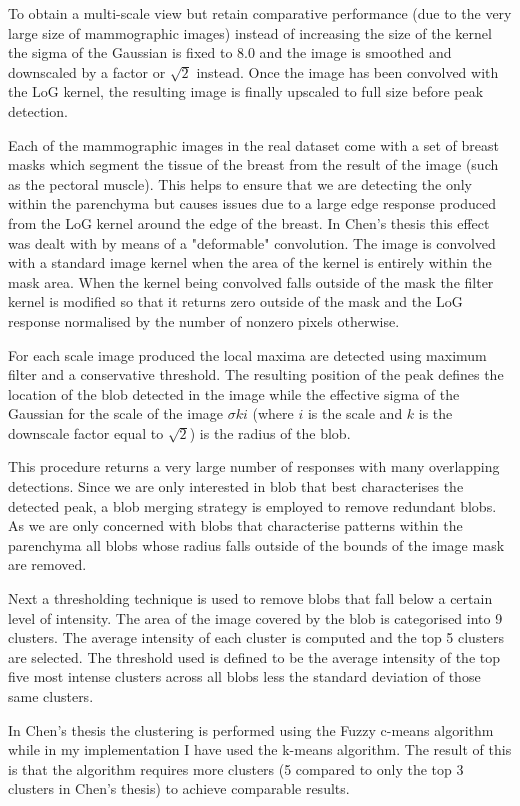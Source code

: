 To obtain a multi-scale view but retain comparative performance (due to the very large size of mammographic images) instead of increasing the size of the kernel the sigma of the Gaussian is fixed to 8.0 and the image is smoothed and downscaled by a factor or $\sqrt{2}$ instead. Once the image has been convolved with the LoG kernel, the resulting image is finally upscaled to full size before peak detection.

Each of the mammographic images in the real dataset come with a set of breast masks which segment the tissue of the breast from the result of the image (such as the pectoral muscle). This helps to ensure that we are detecting the only within the parenchyma but causes issues due to a large edge response produced from the LoG kernel around the edge of the breast. In Chen's thesis this effect was dealt with by means of a "deformable" convolution. The image is convolved with a standard image kernel when the area of the kernel is entirely within the mask area. When the kernel being convolved falls outside of the mask the filter kernel is modified so that it returns zero outside of the mask and the LoG response normalised by the number of nonzero pixels otherwise.

For each scale image produced the local maxima are detected using maximum filter and a conservative threshold. The resulting position of the peak defines the location of the blob detected in the image while the effective sigma of the Gaussian for the scale of the image $\sigma k i$ (where $i$ is the scale and $k$ is the downscale factor equal to $\sqrt{2}$) is the radius of the blob.

This procedure returns a very large number of responses with many overlapping detections. Since we are only interested in blob that best characterises the detected peak, a blob merging strategy is employed to remove redundant blobs. As we are only concerned with blobs that characterise patterns within the parenchyma all blobs whose radius falls outside of the bounds of the image mask are removed. 

Next a thresholding technique is used to remove blobs that fall below a certain level of intensity. The area of the image covered by the blob is categorised into 9 clusters. The average intensity of each cluster is computed and the top 5 clusters are selected. The threshold used is defined to be the average intensity of the top five most intense clusters across all blobs less the standard deviation of those same clusters. 

In Chen's thesis the clustering is performed using the Fuzzy c-means algorithm while in my implementation I have used the k-means algorithm. The result of this is that the algorithm requires more clusters (5 compared to only the top 3 clusters in Chen's thesis) to achieve comparable results.

